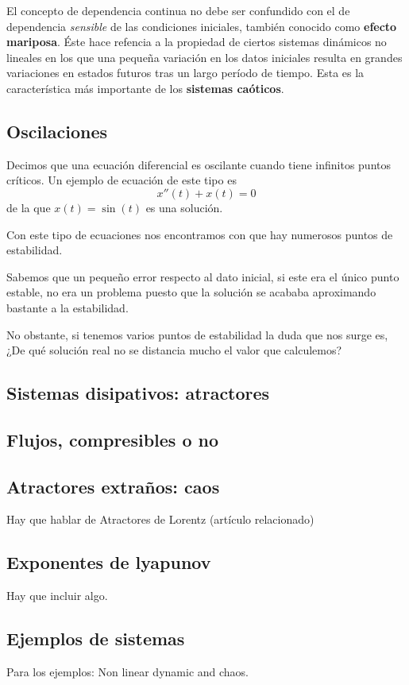 El concepto de dependencia continua no debe ser confundido con el de dependencia \emph{sensible} de las condiciones iniciales, también conocido como \textbf{efecto mariposa}. Éste hace refencia a la propiedad de ciertos sistemas dinámicos no lineales en los que una pequeña variación en los datos iniciales resulta en grandes variaciones en estados futuros tras un largo período de tiempo. Esta es la característica más importante de los \textbf{sistemas caóticos}.

\subsection{Oscilaciones}

\begin{definition}
Decimos que una ecuación diferencial es oscilante cuando tiene infinitos puntos críticos. Un ejemplo de ecuación de este tipo es
\[x''(t)+x(t)=0\]
de la que $x(t)=\sin(t)$ es una solución.
\end{definition}

Con este tipo de ecuaciones nos encontramos con que hay numerosos puntos de estabilidad.

Sabemos que un pequeño error respecto al dato inicial, si este era el único punto estable, no era un problema puesto que la solución se acababa aproximando bastante a la estabilidad.

No obstante, si tenemos varios puntos de estabilidad la duda que nos surge es, ¿De qué solución real no se distancia mucho el valor que calculemos?

\subsection{Sistemas disipativos: atractores}
\subsection{Flujos, compresibles o no}
\subsection{Atractores extraños: caos}
Hay que hablar de Atractores de Lorentz (artículo relacionado)
\subsection{Exponentes de lyapunov}
Hay que incluir algo.
\subsection{Ejemplos de sistemas}
Para los ejemplos: Non linear dynamic and chaos.

